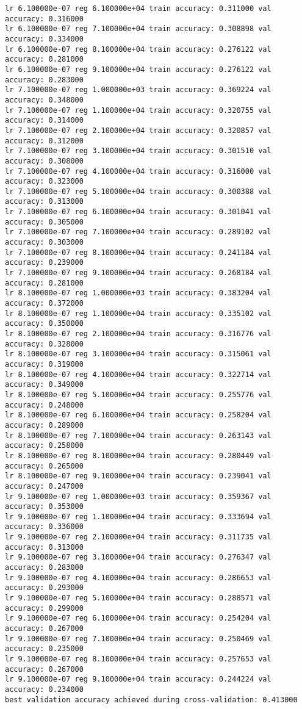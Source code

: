 \documentclass[11pt]{article}
\begin{document}
\begin{Verbatim}[commandchars=\\\{\}]
lr 6.100000e-07 reg 6.100000e+04 train accuracy: 0.311000 val accuracy: 0.316000
lr 6.100000e-07 reg 7.100000e+04 train accuracy: 0.308898 val accuracy: 0.334000
lr 6.100000e-07 reg 8.100000e+04 train accuracy: 0.276122 val accuracy: 0.281000
lr 6.100000e-07 reg 9.100000e+04 train accuracy: 0.276122 val accuracy: 0.283000
lr 7.100000e-07 reg 1.000000e+03 train accuracy: 0.369224 val accuracy: 0.348000
lr 7.100000e-07 reg 1.100000e+04 train accuracy: 0.320755 val accuracy: 0.314000
lr 7.100000e-07 reg 2.100000e+04 train accuracy: 0.320857 val accuracy: 0.312000
lr 7.100000e-07 reg 3.100000e+04 train accuracy: 0.301510 val accuracy: 0.308000
lr 7.100000e-07 reg 4.100000e+04 train accuracy: 0.316000 val accuracy: 0.323000
lr 7.100000e-07 reg 5.100000e+04 train accuracy: 0.300388 val accuracy: 0.313000
lr 7.100000e-07 reg 6.100000e+04 train accuracy: 0.301041 val accuracy: 0.305000
lr 7.100000e-07 reg 7.100000e+04 train accuracy: 0.289102 val accuracy: 0.303000
lr 7.100000e-07 reg 8.100000e+04 train accuracy: 0.241184 val accuracy: 0.239000
lr 7.100000e-07 reg 9.100000e+04 train accuracy: 0.268184 val accuracy: 0.281000
lr 8.100000e-07 reg 1.000000e+03 train accuracy: 0.383204 val accuracy: 0.372000
lr 8.100000e-07 reg 1.100000e+04 train accuracy: 0.335102 val accuracy: 0.350000
lr 8.100000e-07 reg 2.100000e+04 train accuracy: 0.316776 val accuracy: 0.328000
lr 8.100000e-07 reg 3.100000e+04 train accuracy: 0.315061 val accuracy: 0.319000
lr 8.100000e-07 reg 4.100000e+04 train accuracy: 0.322714 val accuracy: 0.349000
lr 8.100000e-07 reg 5.100000e+04 train accuracy: 0.255776 val accuracy: 0.248000
lr 8.100000e-07 reg 6.100000e+04 train accuracy: 0.258204 val accuracy: 0.289000
lr 8.100000e-07 reg 7.100000e+04 train accuracy: 0.263143 val accuracy: 0.258000
lr 8.100000e-07 reg 8.100000e+04 train accuracy: 0.280449 val accuracy: 0.265000
lr 8.100000e-07 reg 9.100000e+04 train accuracy: 0.239041 val accuracy: 0.247000
lr 9.100000e-07 reg 1.000000e+03 train accuracy: 0.359367 val accuracy: 0.353000
lr 9.100000e-07 reg 1.100000e+04 train accuracy: 0.333694 val accuracy: 0.336000
lr 9.100000e-07 reg 2.100000e+04 train accuracy: 0.311735 val accuracy: 0.313000
lr 9.100000e-07 reg 3.100000e+04 train accuracy: 0.276347 val accuracy: 0.283000
lr 9.100000e-07 reg 4.100000e+04 train accuracy: 0.286653 val accuracy: 0.293000
lr 9.100000e-07 reg 5.100000e+04 train accuracy: 0.288571 val accuracy: 0.299000
lr 9.100000e-07 reg 6.100000e+04 train accuracy: 0.254204 val accuracy: 0.267000
lr 9.100000e-07 reg 7.100000e+04 train accuracy: 0.250469 val accuracy: 0.235000
lr 9.100000e-07 reg 8.100000e+04 train accuracy: 0.257653 val accuracy: 0.267000
lr 9.100000e-07 reg 9.100000e+04 train accuracy: 0.244224 val accuracy: 0.234000
best validation accuracy achieved during cross-validation: 0.413000
    \end{Verbatim}
\end{document}
